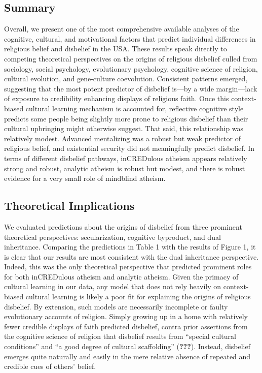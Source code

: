 \documentclass[english,man,mask]{article}
\begin{document}
\hypertarget{summary}{%
\subsection{Summary}\label{summary}}

Overall, we present one of the most comprehensive available analyses of the cognitive, cultural, and motivational factors that predict individual differences in religious belief and disbelief in the USA. These results speak directly to competing theoretical perspectives on the origins of religious disbelief culled from sociology, social psychology, evolutionary psychology, cognitive science of religion, cultural evolution, and gene-culture coevolution. Consistent patterns emerged, suggesting that the most potent predictor of disbelief is---by a wide margin---lack of exposure to credibility enhancing displays of religious faith. Once this context-biased cultural learning mechanism is accounted for, reflective cognitive style predicts some people being slightly more prone to religious disbelief than their cultural upbringing might otherwise suggest. That said, this relationship was relatively modest. Advanced mentalizing was a robust but weak predictor of religious belief, and existential security did not meaningfully predict disbelief. In terms of different disbelief pathways, inCREDulous atheism appears relatively strong and robust, analytic atheism is robust but modest, and there is robust evidence for a very small role of mindblind atheism.

\hypertarget{theoretical-implications}{%
\subsection{Theoretical Implications}\label{theoretical-implications}}

We evaluated predictions about the origins of disbelief from three prominent theoretical perspectives: secularization, cognitive byproduct, and dual inheritance. Comparing the predictions in Table 1 with the results of Figure 1, it is clear that our results are most consistent with the dual inheritance perspective. Indeed, this was the only theoretical perspective that predicted prominent roles for both inCREDulous atheism and analytic atheism. Given the primacy of cultural learning in our data, any model that does not rely heavily on context-biased cultural learning is likely a poor fit for explaining the origins of religious disbelief. By extension, such models are necessarily incomplete or faulty evolutionary accounts of religion. Simply growing up in a home with relatively fewer credible displays of faith predicted disbelief, contra prior assertions from the cognitive science of religion that disbelief results from \enquote{special cultural conditions} and \enquote{a good degree of cultural scaffolding} ({\textbf{???}}). Instead, disbelief emerges quite naturally and easily in the mere relative absence of repeated and credible cues of others' belief.
\end{document}
